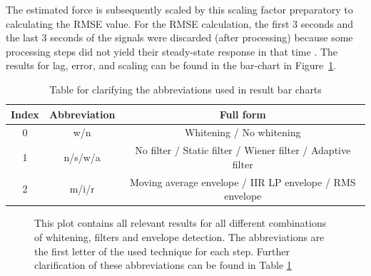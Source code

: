 The estimated force is subsequently scaled by this scaling factor preparatory to calculating the RMSE value. For the RMSE calculation, the first 3 seconds and the last 3 seconds of the signals were discarded (after processing) because some processing steps did not yield their steady-state response in that time \cite{transient_response}. The results for lag, error, and scaling can be found in the bar-chart in Figure~\ref{fig:result_all_lagerrorscaling}. 

\begin{table} [h!]
\begin{tabular}{ccc}
Index & Abbreviation & Full form \\
\hline
0 & w/n & Whitening / No whitening \\
1 & n/s/w/a & No filter / Static filter / Wiener filter / Adaptive filter \\
2 & m/i/r & Moving average envelope / IIR LP envelope / RMS envelope \\
\end{tabular}
\caption{Table for clarifying the abbreviations used in result bar charts}
\label{tab:abbreviation_explanation}
\end{table}

\begin{figure}[h!t]
	\begin{center}
	\noindent{}
	\end{center}
	\caption{This plot contains all relevant results for all different combinations of whitening, filters and envelope detection. The abbreviations are the first letter of the used technique for each step. Further clarification of these abbreviations can be found in Table \ref{tab:abbreviation_explanation}}
	\label{fig:result_all_lagerrorscaling}
\end{figure}

